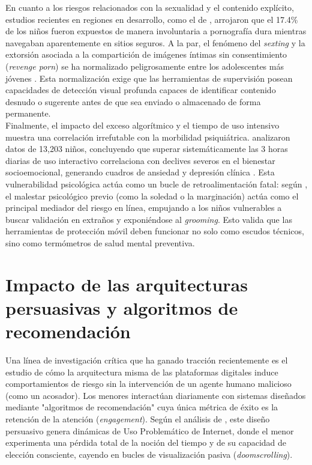 En cuanto a los riesgos relacionados con la sexualidad y el contenido explícito, estudios recientes en regiones en desarrollo, como el de \cite{yusuf_lets_2023}, arrojaron que el 17.4\% de los niños fueron expuestos de manera involuntaria a pornografía dura mientras navegaban aparentemente en sitios seguros. A la par, el fenómeno del \textit{sexting} y la extorsión asociada a la compartición de imágenes íntimas sin consentimiento (\textit{revenge porn}) se ha normalizado peligrosamente entre los adolescentes más jóvenes \cite{tomczyk_sexting_2023}. Esta normalización exige que las herramientas de supervisión posean capacidades de detección visual profunda capaces de identificar contenido desnudo o sugerente antes de que sea enviado o almacenado de forma permanente.\\

Finalmente, el impacto del exceso algorítmico y el tiempo de uso intensivo muestra una correlación irrefutable con la morbilidad psiquiátrica. \cite{bohnert_emerging_2021} analizaron datos de 13,203 niños, concluyendo que superar sistemáticamente las 3 horas diarias de uso interactivo correlaciona con declives severos en el bienestar socioemocional, generando cuadros de ansiedad y depresión clínica \cite{marciano_digital_2022}. Esta vulnerabilidad psicológica actúa como un bucle de retroalimentación fatal: según \cite{el-asam_psychological_2022}, el malestar psicológico previo (como la soledad o la marginación) actúa como el principal mediador del riesgo en línea, empujando a los niños vulnerables a buscar validación en extraños y exponiéndose al \textit{grooming}. Esto valida que las herramientas de protección móvil deben funcionar no solo como escudos técnicos, sino como termómetros de salud mental preventiva.

\section{Impacto de las arquitecturas persuasivas y algoritmos de recomendación}

Una línea de investigación crítica que ha ganado tracción recientemente es el estudio de cómo la arquitectura misma de las plataformas digitales induce comportamientos de riesgo sin la intervención de un agente humano malicioso (como un acosador). Los menores interactúan diariamente con sistemas diseñados mediante "algoritmos de recomendación" cuya única métrica de éxito es la retención de la atención (\textit{engagement}). Según el análisis de \cite{selak_problematic_2025}, este diseño persuasivo genera dinámicas de Uso Problemático de Internet, donde el menor experimenta una pérdida total de la noción del tiempo y de su capacidad de elección consciente, cayendo en bucles de visualización pasiva (\textit{doomscrolling}).\\

